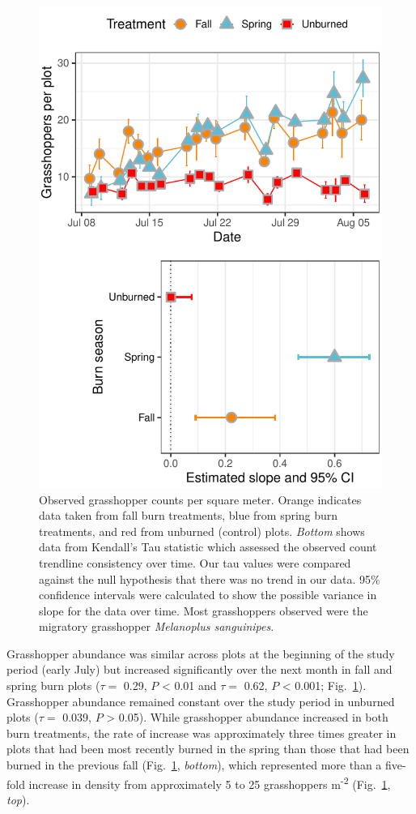 \documentclass[referee, 
	            sn-basic]
           {sn-jnl}
\begin{document}
\begin{linenumbers}
\begin{figure}
\centering
\includegraphics{tau_gg-1.pdf}
\caption{Observed grasshopper counts per square meter. 
Orange indicates data taken from fall burn treatments, blue from spring burn treatments, and red from unburned (control) plots.
\emph{Bottom} shows data from Kendall's Tau statistic which assessed the observed count trendline consistency over time. 
Our tau values were compared against the null hypothesis that there was no trend in our data. 
95\% confidence intervals were calculated to show the possible variance in slope for the data over time. 
Most grasshoppers observed were the migratory grasshopper \emph{Melanoplus sanguinipes}.}
\label{tau} %
\end{figure}

Grasshopper abundance was similar across plots at the beginning of the study period (early July) but increased significantly over the next month in fall and spring burn plots (\(\tau =\) 0.29, \(P\) \textless{} 0.01 and \(\tau =\) 0.62, \(P\) \textless{} 0.001; Fig.~\ref{tau}). 
Grasshopper abundance remained constant over the study period in unburned plots (\(\tau =\) 0.039, \(P\) \textgreater{} 0.05). 
While grasshopper abundance increased in both burn treatments, the rate of increase was approximately three times greater in plots that had been most recently burned in the spring than those that had been burned in the previous fall (Fig.~\ref{tau}, \emph{bottom}), which represented more than a five-fold increase in density from approximately 5 to 25 grasshoppers m\textsuperscript{-2} (Fig.~\ref{tau}, \emph{top}).


\end{linenumbers}
\end{document}
